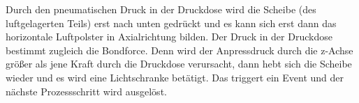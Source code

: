 		Durch den pneumatischen Druck in der Druckdose wird die Scheibe (des luftgelagerten Teils) erst nach unten gedrückt und es kann sich erst dann das horizontale Luftpolster in Axialrichtung bilden. Der Druck in der Druckdose bestimmt zugleich die Bondforce. Denn wird der Anpressdruck durch die z-Achse größer als jene Kraft durch die Druckdose verursacht, dann hebt sich die Scheibe wieder und es wird eine Lichtschranke betätigt. Das triggert ein Event und der nächste Prozessschritt wird ausgelöst.